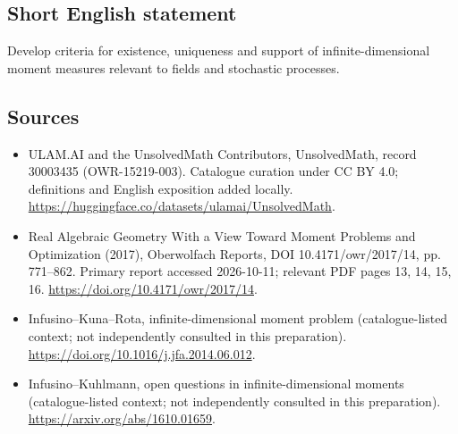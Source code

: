 \documentclass[11pt]{article}
\begin{document}
\subsection{Short English statement}
Develop criteria for existence, uniqueness and support of infinite-dimensional moment measures relevant to fields and stochastic processes.
\subsection{Sources}
\begin{itemize}
\item[\hypertarget{source:30003435:1}{S1}] ULAM.AI and the UnsolvedMath Contributors, UnsolvedMath, record 30003435 (OWR-15219-003). Catalogue curation under CC BY 4.0; definitions and English exposition added locally.
\url{https://huggingface.co/datasets/ulamai/UnsolvedMath}.
\item[\hypertarget{source:30003435:2}{S2}] Real Algebraic Geometry With a View Toward Moment Problems and Optimization (2017), Oberwolfach Reports, DOI 10.4171/owr/2017/14, pp. 771--862. Primary report accessed 2026-10-11; relevant PDF pages 13, 14, 15, 16.
\url{https://doi.org/10.4171/owr/2017/14}.
\item[\hypertarget{source:30003435:3}{S3}] Infusino--Kuna--Rota, infinite-dimensional moment problem (catalogue-listed context; not independently consulted in this preparation).
\url{https://doi.org/10.1016/j.jfa.2014.06.012}.
\item[\hypertarget{source:30003435:4}{S4}] Infusino--Kuhlmann, open questions in infinite-dimensional moments (catalogue-listed context; not independently consulted in this preparation).
\url{https://arxiv.org/abs/1610.01659}.
\end{itemize}
\label{end:30003435}
\end{document}
